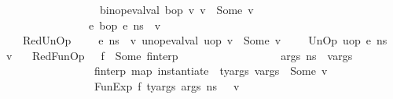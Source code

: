 \begin{isabellebody}
\ \ \ \ \ \ \ \ \ \ \ \ \ \ \ \ \ binop{\isacharunderscore}{\kern0pt}eval{\isacharunderscore}{\kern0pt}val\ bop\ v{}\ v{}\ {\isacharequal}{\kern0pt}\ {\isacharparenleft}{\kern0pt}Some\ v{\isacharparenright}{\kern0pt}\ {\isasymrbrakk}\ {\isasymLongrightarrow}\ \isanewline
\ \ \ \ \ \ \ \ \ \ \ \ \ {\isasymLambda}{\isacharcomma}{\kern0pt}{\isasymGamma}{\isacharcomma}{\kern0pt}{\isasymOmega}\ {\isasymturnstile}\ {\isasymlangle}{\isacharparenleft}{\kern0pt}e{}\ {\isasymguillemotleft}bop{\isasymguillemotright}\ e{}{\isacharparenright}{\kern0pt}{\isacharcomma}{\kern0pt}\ n{\isacharunderscore}{\kern0pt}s{\isasymrangle}\ {\isasymDown}\ v{\isachardoublequoteclose}\isanewline
\ \ {\isacharbar}{\kern0pt}\ RedUnOp{\isacharcolon}{\kern0pt}\ {\isachardoublequoteopen}\ {\isasymlbrakk}\ {\isasymLambda}{\isacharcomma}{\kern0pt}{\isasymGamma}{\isacharcomma}{\kern0pt}{\isasymOmega}\ {\isasymturnstile}\ {\isasymlangle}e{\isacharcomma}{\kern0pt}\ n{\isacharunderscore}{\kern0pt}s{\isasymrangle}\ {\isasymDown}\ v{\isacharsemicolon}{\kern0pt}\ unop{\isacharunderscore}{\kern0pt}eval{\isacharunderscore}{\kern0pt}val\ uop\ v\ {\isacharequal}{\kern0pt}\ Some\ v{\isacharprime}{\kern0pt}\ {\isasymrbrakk}\ {\isasymLongrightarrow}\ {\isasymLambda}{\isacharcomma}{\kern0pt}{\isasymGamma}{\isacharcomma}{\kern0pt}{\isasymOmega}\ {\isasymturnstile}\ {\isasymlangle}UnOp\ uop\ e{\isacharcomma}{\kern0pt}\ n{\isacharunderscore}{\kern0pt}s{\isasymrangle}\ {\isasymDown}\ v{\isacharprime}{\kern0pt}{\isachardoublequoteclose}\isanewline
\ \ {\isacharbar}{\kern0pt}\ RedFunOp{\isacharcolon}{\kern0pt}\ {\isachardoublequoteopen}{\isasymlbrakk}\ {\isasymGamma}\ f\ {\isacharequal}{\kern0pt}\ Some\ f{\isacharunderscore}{\kern0pt}interp{\isacharsemicolon}{\kern0pt}\isanewline
\ \ \ \ \ \ \ \ \ \ \ \ \ \ \ \ {\isasymLambda}{\isacharcomma}{\kern0pt}{\isasymGamma}{\isacharcomma}{\kern0pt}{\isasymOmega}\ {\isasymturnstile}\ {\isasymlangle}args{\isacharcomma}{\kern0pt}\ n{\isacharunderscore}{\kern0pt}s{\isasymrangle}\ {\isacharbrackleft}{\kern0pt}{\isasymDown}{\isacharbrackright}{\kern0pt}\ v{\isacharunderscore}{\kern0pt}args{\isacharsemicolon}{\kern0pt}\isanewline
\ \ \ \ \ \ \ \ \ \ \ \ \ \ \ \ f{\isacharunderscore}{\kern0pt}interp\ {\isacharparenleft}{\kern0pt}map\ {\isacharparenleft}{\kern0pt}instantiate\ {\isasymOmega}{\isacharparenright}{\kern0pt}\ ty{\isacharunderscore}{\kern0pt}args{\isacharparenright}{\kern0pt}\ v{\isacharunderscore}{\kern0pt}args\ {\isacharequal}{\kern0pt}\ Some\ v\ {\isasymrbrakk}\ {\isasymLongrightarrow}\isanewline
\ \ \ \ \ \ \ \ \ \ \ \ \ {\isasymLambda}{\isacharcomma}{\kern0pt}{\isasymGamma}{\isacharcomma}{\kern0pt}{\isasymOmega}\ {\isasymturnstile}\ {\isasymlangle}\ FunExp\ f\ ty{\isacharunderscore}{\kern0pt}args\ args{\isacharcomma}{\kern0pt}\ n{\isacharunderscore}{\kern0pt}s\ {\isasymrangle}\ {\isasymDown}\ v{\isachardoublequoteclose}\isanewline

\end{isabellebody}
